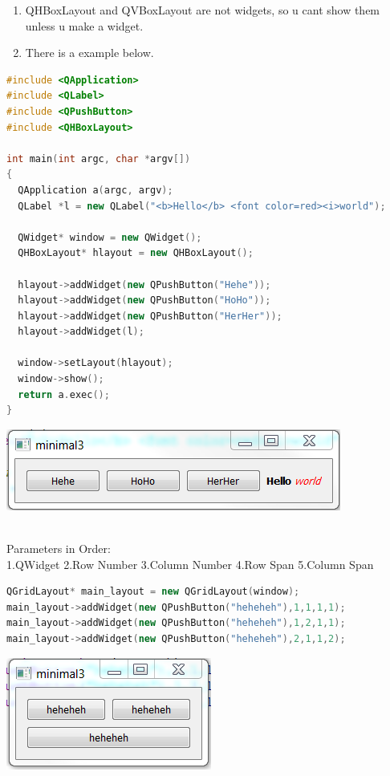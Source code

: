 \begin{note}
\begin{enumerate}
	\item QHBoxLayout and QVBoxLayout are not widgets, so u cant show them unless u make a widget.
	\item There is a example below.
\end{enumerate}
\begin{lstlisting}[language = {c++}]
#include <QApplication>
#include <QLabel>
#include <QPushButton>
#include <QHBoxLayout>

int main(int argc, char *argv[])
{
  QApplication a(argc, argv);
  QLabel *l = new QLabel("<b>Hello</b> <font color=red><i>world");

  QWidget* window = new QWidget();
  QHBoxLayout* hlayout = new QHBoxLayout();

  hlayout->addWidget(new QPushButton("Hehe"));
  hlayout->addWidget(new QPushButton("HoHo"));
  hlayout->addWidget(new QPushButton("HerHer"));
  hlayout->addWidget(l);

  window->setLayout(hlayout);
  window->show();
  return a.exec();
}
\end{lstlisting}
\begin{center}
\includegraphics[]{Images/QT/HBox}
\end{center}
\end{note}

\begin{note}[QGridLayout]\\
Parameters in Order:\\
1.QWidget 2.Row Number 3.Column Number 4.Row Span 5.Column Span
\begin{lstlisting}[language = {c++}]
QGridLayout* main_layout = new QGridLayout(window);
main_layout->addWidget(new QPushButton("heheheh"),1,1,1,1);
main_layout->addWidget(new QPushButton("heheheh"),1,2,1,1);
main_layout->addWidget(new QPushButton("heheheh"),2,1,1,2);
\end{lstlisting}
\begin{center}
	\includegraphics[]{Images/QT/QGrid}
\end{center}
\end{note}

